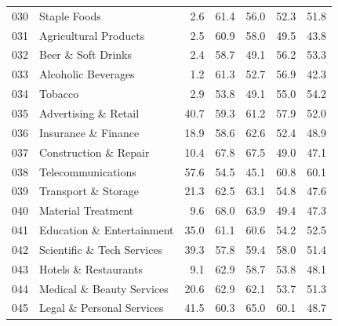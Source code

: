 \begin{tabular}{llrrrrr}
030 & Staple Foods & 2.6 & 61.4 & 56.0 & 52.3 & 51.8 \\
031 & Agricultural Products & 2.5 & 60.9 & 58.0 & 49.5 & 43.8 \\
032 & Beer \& Soft Drinks & 2.4 & 58.7 & 49.1 & 56.2 & 53.3 \\
033 & Alcoholic Beverages & 1.2 & 61.3 & 52.7 & 56.9 & 42.3 \\
034 & Tobacco & 2.9 & 53.8 & 49.1 & 55.0 & 54.2 \\
035 & Advertising \& Retail & 40.7 & 59.3 & 61.2 & 57.9 & 52.0 \\
036 & Insurance \& Finance & 18.9 & 58.6 & 62.6 & 52.4 & 48.9 \\
037 & Construction \& Repair & 10.4 & 67.8 & 67.5 & 49.0 & 47.1 \\
038 & Telecommunications & 57.6 & 54.5 & 45.1 & 60.8 & 60.1 \\
039 & Transport \& Storage & 21.3 & 62.5 & 63.1 & 54.8 & 47.6 \\
040 & Material Treatment & 9.6 & 68.0 & 63.9 & 49.4 & 47.3 \\
041 & Education \& Entertainment & 35.0 & 61.1 & 60.6 & 54.2 & 52.5 \\
042 & Scientific \& Tech Services & 39.3 & 57.8 & 59.4 & 58.0 & 51.4 \\
043 & Hotels \& Restaurants & 9.1 & 62.9 & 58.7 & 53.8 & 48.1 \\
044 & Medical \& Beauty Services & 20.6 & 62.9 & 62.1 & 53.7 & 51.3 \\
045 & Legal \& Personal Services & 41.5 & 60.3 & 65.0 & 60.1 & 48.7 \\
\bottomrule
\end{tabular}
